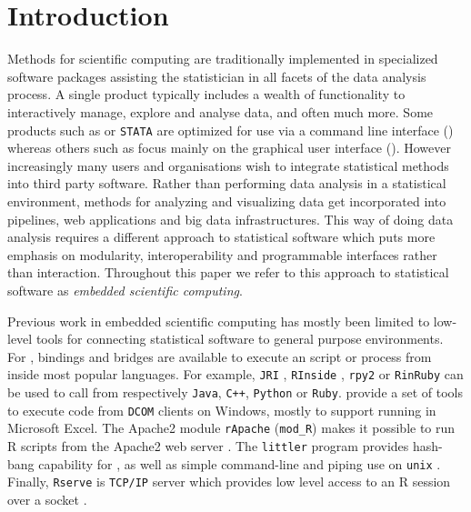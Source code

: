 \section{Introduction}

Methods for scientific computing are traditionally implemented in specialized software packages assisting the statistician in all facets of the data analysis process. A single product typically includes a wealth of functionality to interactively manage, explore and analyse data, and often much more. Some products such as \R or \texttt{STATA} are optimized for use via a command line interface (\CLI) whereas others such as \SPSS focus mainly on the graphical user interface (\GUI). However increasingly many users and organisations wish to integrate statistical methods into third party software. Rather than performing data analysis in a statistical environment, methods for analyzing and visualizing data get incorporated into pipelines, web applications and big data infrastructures. This way of doing data analysis requires a different approach to statistical software which puts more emphasis on modularity, interoperability and programmable interfaces rather than \UI interaction. Throughout this paper we refer to this approach to statistical software as \emph{embedded scientific computing}.

Previous work in embedded scientific computing has mostly been limited to low-level tools for connecting statistical software to general purpose environments. For \R, bindings and bridges are available to execute an \R script or process from inside most popular languages. For example, \texttt{JRI} \citep{rjava}, \texttt{RInside} \citep{eddelbuettel2011rcpp}, \texttt{rpy2} \citep{gautier2008rpy2} or \texttt{RinRuby} \citep{dahl2008rinruby} can be used to call \R from respectively \texttt{Java}, \texttt{C++}, \texttt{Python} or \texttt{Ruby}. \cite{heiberger2009r} provide a set of tools to execute \R code from \texttt{DCOM} clients on Windows, mostly to support running \R in Microsoft Excel. The Apache2 module \texttt{rApache} (\texttt{mod\_R}) makes it possible to run R scripts from the Apache2 web server \citep{horner2013rapache}. The \texttt{littler} program provides hash-bang capability for \R, as well as simple command-line and piping use on \texttt{unix} \citep{littler}. Finally, \texttt{Rserve} is \texttt{TCP/IP} server which provides low level access to an R session over a socket \citep{urbanek2013rserve}. 

